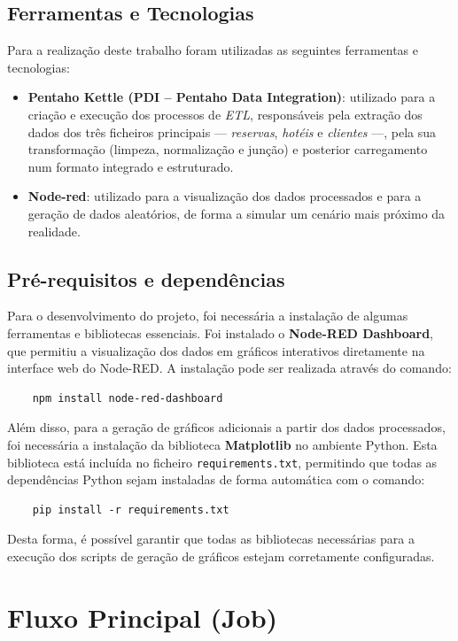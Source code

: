 \documentclass[a4paper, 12pt]{article} %
\begin{document}
\subsection{Ferramentas e Tecnologias}

Para a realização deste trabalho foram utilizadas as seguintes ferramentas e tecnologias:

\begin{itemize}
	\item \textbf{Pentaho Kettle (PDI – Pentaho Data Integration)}: utilizado para a criação e execução dos processos de \textit{ETL}, responsáveis pela extração dos dados dos três ficheiros principais — \textit{reservas}, \textit{hotéis} e \textit{clientes} —, pela sua transformação (limpeza, normalização e junção) e posterior carregamento num formato integrado e estruturado.
	\item \textbf{Node-red}: utilizado para a visualização dos dados processados e para a geração de dados aleatórios, de forma a simular um cenário mais próximo da realidade.
\end{itemize}

\subsection{Pré-requisitos e dependências}
Para o desenvolvimento do projeto, foi necessária a instalação de algumas ferramentas e bibliotecas essenciais.  
Foi instalado o \textbf{Node-RED Dashboard}, que permitiu a visualização dos dados em gráficos interativos diretamente na interface web do Node-RED. A instalação pode ser realizada através do comando:
\begin{verbatim}
	npm install node-red-dashboard
\end{verbatim}

\newpage

Além disso, para a geração de gráficos adicionais a partir dos dados processados, foi necessária a instalação da biblioteca \textbf{Matplotlib} no ambiente Python. Esta biblioteca está incluída no ficheiro \texttt{requirements.txt}, permitindo que todas as dependências Python sejam instaladas de forma automática com o comando:
\begin{verbatim}
	pip install -r requirements.txt
\end{verbatim}
Desta forma, é possível garantir que todas as bibliotecas necessárias para a execução dos scripts de geração de gráficos estejam corretamente configuradas.

\section{Fluxo Principal (Job)}
\end{document}

